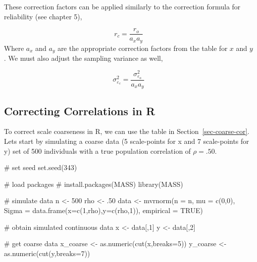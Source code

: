 \documentclass[
  letterpaper,
  DIV=11,
  numbers=noendperiod]{scrreprt}
\newenvironment{Shaded}{\begin{snugshade}}{\end{snugshade}}
\newcommand{\AttributeTok}[1]{\textcolor[rgb]{0.40,0.45,0.13}{#1}}
\newcommand{\CommentTok}[1]{\textcolor[rgb]{0.37,0.37,0.37}{#1}}
\newcommand{\ConstantTok}[1]{\textcolor[rgb]{0.56,0.35,0.01}{#1}}
\newcommand{\DecValTok}[1]{\textcolor[rgb]{0.68,0.00,0.00}{#1}}
\newcommand{\FunctionTok}[1]{\textcolor[rgb]{0.28,0.35,0.67}{#1}}
\newcommand{\NormalTok}[1]{\textcolor[rgb]{0.00,0.23,0.31}{#1}}
\newcommand{\OtherTok}[1]{\textcolor[rgb]{0.00,0.23,0.31}{#1}}
\begin{document}
These correction factors can be applied similarly to the correction
formula for reliability (see chapter 5),

\[
r_c = \frac{r_o}{a_x a_y}
\] Where \(a_x\) and \(a_y\) are the appropriate correction factors from
the table for \(x\) and \(y\). We must also adjust the sampling variance
as well,

\[
\sigma^2_{\varepsilon_c} = \frac{\sigma^2_{\varepsilon_o}}{a_x a_y}
\]

\hypertarget{correcting-correlations-in-r-2}{%
\subsection{Correcting Correlations in
R}\label{correcting-correlations-in-r-2}}

To correct scale coarseness in R, we can use the table in
Section~\ref{sec-coarse-cor}. Lets start by simulating a coarse data (5
scale-points for x and 7 scale-points for y) set of 500 individuals with
a true population correlation of \(\rho = .50\).

\begin{Shaded}
\begin{Highlighting}[]
\CommentTok{\# set seed}
\FunctionTok{set.seed}\NormalTok{(}\DecValTok{343}\NormalTok{)}

\CommentTok{\# load packages}
\CommentTok{\# install.packages(\textquotesingle{}MASS\textquotesingle{})}
\FunctionTok{library}\NormalTok{(MASS)}

\CommentTok{\# simulate data}
\NormalTok{n }\OtherTok{\textless{}{-}} \DecValTok{500}
\NormalTok{rho }\OtherTok{\textless{}{-}}\NormalTok{ .}\DecValTok{50}
\NormalTok{data }\OtherTok{\textless{}{-}} \FunctionTok{mvrnorm}\NormalTok{(}\AttributeTok{n =}\NormalTok{ n,}
                \AttributeTok{mu =} \FunctionTok{c}\NormalTok{(}\DecValTok{0}\NormalTok{,}\DecValTok{0}\NormalTok{),}
                \AttributeTok{Sigma =} \FunctionTok{data.frame}\NormalTok{(}\AttributeTok{x=}\FunctionTok{c}\NormalTok{(}\DecValTok{1}\NormalTok{,rho),}\AttributeTok{y=}\FunctionTok{c}\NormalTok{(rho,}\DecValTok{1}\NormalTok{)),}
                \AttributeTok{empirical =} \ConstantTok{TRUE}\NormalTok{)}

\CommentTok{\# obtain simulated continuous data}
\NormalTok{x }\OtherTok{\textless{}{-}}\NormalTok{ data[,}\DecValTok{1}\NormalTok{]}
\NormalTok{y }\OtherTok{\textless{}{-}}\NormalTok{ data[,}\DecValTok{2}\NormalTok{]}

\CommentTok{\# get coarse data}
\NormalTok{x\_coarse }\OtherTok{\textless{}{-}} \FunctionTok{as.numeric}\NormalTok{(}\FunctionTok{cut}\NormalTok{(x,}\AttributeTok{breaks=}\DecValTok{5}\NormalTok{)) }
\NormalTok{y\_coarse }\OtherTok{\textless{}{-}} \FunctionTok{as.numeric}\NormalTok{(}\FunctionTok{cut}\NormalTok{(y,}\AttributeTok{breaks=}\DecValTok{7}\NormalTok{)) }
\end{Highlighting}
\end{Shaded}
\end{document}
